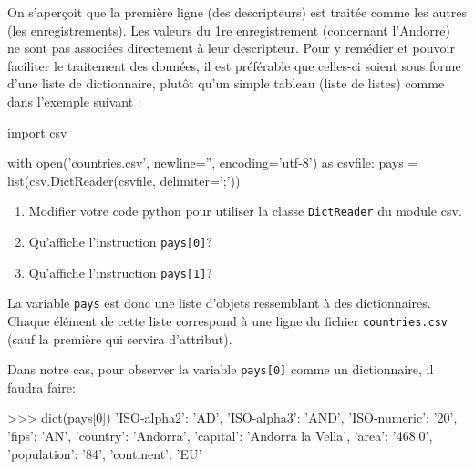 \begin{remarque}{\quad}{}
    On s'aperçoit que la première ligne (des descripteurs) est traitée comme les autres (les enregistrements).
    Les valeurs du 1re enregistrement (concernant l'Andorre) ne sont pas associées directement à leur descripteur. Pour y remédier et pouvoir faciliter le traitement des données, il est préférable que celles-ci soient sous forme d'une liste de dictionnaire, plutôt qu'un simple tableau (liste de listes) comme dans l'exemple suivant :
\end{remarque}


\begin{CodePythontexAlt}[Largeur=1\linewidth,Centre,PremLigne=1, lineNumbers=false]{}
import csv

with open('countries.csv', newline='', encoding='utf-8') as csvfile:
    pays = list(csv.DictReader(csvfile, delimiter=';'))
\end{CodePythontexAlt}

\begin{exercice_cours}{}
\begin{enumerate}
	\item Modifier votre code python pour utiliser la classe \verb|DictReader| du module csv.
	\item Qu'affiche l'instruction \texttt{pays[0]}?
	\item Qu'affiche l'instruction \texttt{pays[1]}?
\end{enumerate}
\end{exercice_cours}




\begin{remarque}{\quad}{}
La variable \verb+pays+ est donc une liste d'objets ressemblant à des dictionnaires. Chaque élément de cette liste correspond à une ligne du fichier \verb|countries.csv| (sauf la première qui servira d'attribut).

\end{remarque}

\medskip

Dans notre cas, pour observer la variable \verb+pays[0]+ comme un dictionnaire, il faudra faire:

\begin{CodePythontexAlt}[Largeur=1\linewidth,Centre,PremLigne=1, lineNumbers=false]{}
>>> dict(pays[0])
{'ISO-alpha2': 'AD', 'ISO-alpha3': 'AND', 'ISO-numeric': '20', 'fips': 'AN', 'country': 'Andorra', 
 'capital': 'Andorra la Vella', 'area': '468.0', 'population': '84', 'continent': 'EU'}
\end{CodePythontexAlt}

